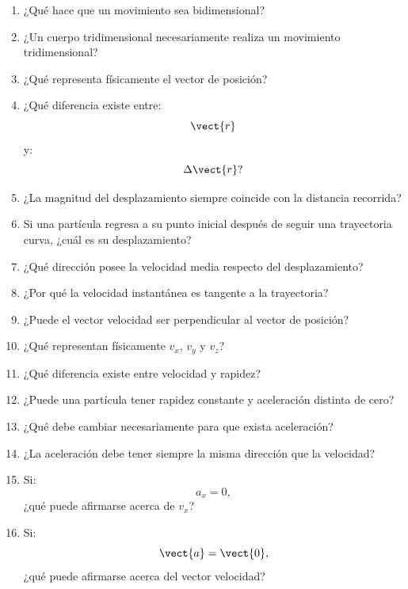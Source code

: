 \begin{enumerate}
    \item ¿Qué hace que un movimiento sea bidimensional?

    \item ¿Un cuerpo tridimensional necesariamente realiza un movimiento
    tridimensional?

    \item ¿Qué representa físicamente el vector de posición?

    \item ¿Qué diferencia existe entre:
    \[
    \vect{r}
    \]
    y:
    \[
    \Delta\vect{r}?
    \]

    \item ¿La magnitud del desplazamiento siempre coincide con la distancia
    recorrida?

    \item Si una partícula regresa a su punto inicial después de seguir una
    trayectoria curva, ¿cuál es su desplazamiento?

    \item ¿Qué dirección posee la velocidad media respecto del desplazamiento?

    \item ¿Por qué la velocidad instantánea es tangente a la trayectoria?

    \item ¿Puede el vector velocidad ser perpendicular al vector de posición?

    \item ¿Qué representan físicamente \(v_x\), \(v_y\) y \(v_z\)?

    \item ¿Qué diferencia existe entre velocidad y rapidez?

    \item ¿Puede una partícula tener rapidez constante y aceleración distinta de
    cero?

    \item ¿Qué debe cambiar necesariamente para que exista aceleración?

    \item ¿La aceleración debe tener siempre la misma dirección que la velocidad?

    \item Si:
    \[
    a_x=0,
    \]
    ¿qué puede afirmarse acerca de \(v_x\)?

    \item Si:
    \[
    \vect{a}=\vect{0},
    \]
    ¿qué puede afirmarse acerca del vector velocidad?


\end{enumerate}
